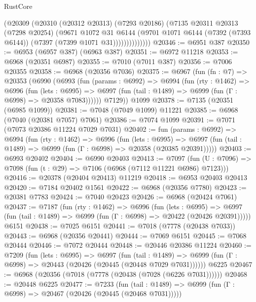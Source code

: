 \begin{lexlean}{RustCore}
\begin{coremodule}
                  (@20309
                    (@20310
                      (@20312 @20313)
                      (@7293 @20186)
                      (@7135
                        @20311
                        @20313
                        (@7298 @20254)
                        (@9671
                          @1072
                          @31
                          @6144
                          (@9701
                            @1071
                            @6144
                            (@7392 (@7393 @6144))
                            (@7397 (@7399 @1071 @31))))))))))))))
@20346 := @6951 @387
@20350 := @6953 (@6957 @387) (@6963 @387)
@20351 := @6972 @11218
@20353 := @6968 (@20351 @6987)
@20355 := @7010 (@7011 @387)
@20356 := @7006 @20355
@20358 := @6968 (@20356 @7036)
@20375 := @6967
    (fun (fn : @7) =>
    @20353
      (@6990
        (@6993
          (fun (params : @6992) =>
          @6994
            (fun (rty : @1462) =>
            @6996
              (fun (lets : @6995) =>
              @6997 (fun (tail : @1489) => @6999 (fun (Γ : @6998) => @20358 @7083))))))
        @7129))
    @1099
@20378 := @7135 (@20351 (@6985 @1099))
@20381 := @7048 (@7049 @1099) @11221
@20385 := @6968 (@7040 (@20381 @7057) @7061)
@20386 := @7074 @1099
@20391 := @7071 (@7073 @20386 @11224 @7029 @7031)
@20402 := fun (params : @6992) =>
  @6994
    (fun (rty : @1462) =>
    @6996
      (fun (lets : @6995) =>
      @6997 (fun (tail : @1489) => @6999 (fun (Γ : @6998) => @20358 (@20385 @20391)))))
@20403 := @6993 @20402
@20404 := @6990 @20403
@20413 := @7097
    (fun (U : @7096) => @7098 (fun (t : @29) => @7106 (@6968 (@7112 @11221 @6986) @7123)))
@20416 := @20378 (@20404 @20413) @11219
@20418 := @6953 @20403 @20413
@20420 := @7184 @20402 @1561
@20422 := @6968 (@20356 @7780)
@20423 := @20381 @7783
@20424 := @7040 @20423
@20426 := @6968 (@20424 @7061)
@20437 := @7187
    (fun (rty : @1462) =>
    @6996
      (fun (lets : @6995) =>
      @6997 (fun (tail : @1489) => @6999 (fun (Γ : @6998) => @20422 (@20426 @20391)))))
    @6151
@20438 := @7025 @6151
@20441 := @7018 (@7778 (@20438 @7033))
@20443 := @6968 (@20356 @20441)
@20444 := @7069 @6151
@20445 := @7068 @20444
@20446 := @7072 @20444
@20448 := @20446 @20386 @11224
@20460 := @7209
    (fun (lets : @6995) =>
    @6997
      (fun (tail : @1489) =>
      @6999 (fun (Γ : @6998) => @20443 (@20426 (@20445 (@20448 @7029 @7031))))))
    @6225
@20467 := @6968 (@20356 (@7018 (@7778 (@20438 (@7028 (@6226 @7031))))))
@20468 := @20448 @6225
@20477 := @7233
    (fun (tail : @1489) => @6999 (fun (Γ : @6998) => @20467 (@20426 (@20445 (@20468 @7031)))))

\end{coremodule}
\end{lexlean}

